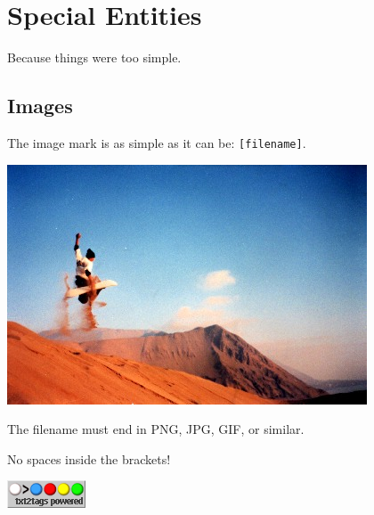 \documentclass{article}
\begin{document}
\section*{Special Entities}

Because things were too simple.

\subsection*{Images}

The image mark is as simple as it can be: \texttt{[filename]}.

\includegraphics{img/photo.jpg}

\begin{compactitem}
\item The filename must end in PNG, JPG, GIF, or similar.
\item No spaces inside the brackets!
\end{compactitem}

\hrulefill{}

\includegraphics{img/t2tpowered.png}

\end{document}
